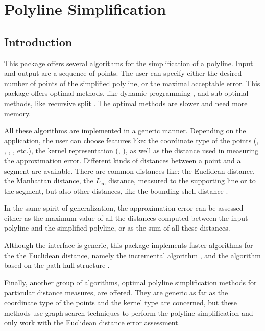 \chapter{Polyline Simplification}
\label{chap:simplify_polyline}


\section{Introduction}

This package offers several algorithms for the simplification of a
polyline. Input and output are a sequence of points.  The user can
specify either the desired number of points of the simplified polyline,
or the maximal acceptable error. This package offers optimal methods, like
dynamic programming \cite{[cgal:gt-dpasrcp-93]}, and sub-optimal methods, 
like recursive split \cite{[dp-arnpr-73]}. The optimal methods
are slower and need more memory.

All these algorithms are implemented in a generic manner. Depending on
the application, the user can choose features like: the coordinate type of the
points (, , , ,
etc.), the kernel representation (, ),
as well as the distance used in measuring the approximation error.
Different kinds of distances between a point and a segment are available. 
There are common distances like: the Euclidean distance, the Manhattan distance,
the $L_\infty$ distance, measured to the supporting line or to the segment, but
also other distances, like the bounding shell distance \cite{[cgal:v-hal-94]}. 

In the same spirit of generalization, the approximation error can be assessed either as
the maximum value of all the distances computed between the input
polyline and the simplified polyline, or as the sum of all
these distances.

Although the interface is generic, this package implements faster algorithms
for the the Euclidean distance, namely the incremental algorithm \cite{[cgal:pv-opadc-94]},
and the algorithm based on the path hull structure \cite{[hs-sudpl-92]}.

Finally, another group of algorithms, optimal polyline simplification methods
for particular distance measures, are offered. They are generic
as far as the coordinate type of the points and the kernel type are
concerned, but these methods use graph search techniques \cite{[cgal:ii-pac]} to
perform the polyline simplification and only work with the Euclidean distance error
assessment.

